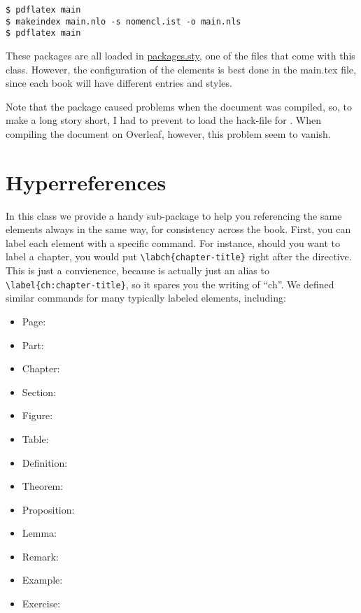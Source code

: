 \begin{lstlisting}[style=kaolstplain]
$ pdflatex main
$ makeindex main.nlo -s nomencl.ist -o main.nls
$ pdflatex main
\end{lstlisting}

These packages are all loaded in 
\href{style/packages.sty}{packages.sty}, one of the files that come with 
this class. However, the configuration of the elements is best done in 
the main.tex file, since each book will have different entries and 
styles.

Note that the  package caused problems when the 
document was compiled, so, to make a long story short, I had to prevent 
 to load the hack-file for . When 
compiling the document on Overleaf, however, this problem seem to 
vanish.


\section{Hyperreferences}

In this class we provide a handy sub-package to help you referencing the 
same elements always in the same way, for consistency across the book. 
First, you can label each element with a specific command. For instance, 
should you want to label a chapter, you would put 
\lstinline|\labch{chapter-title}| right after the  
directive. This is just a convienence, because  is 
actually just an alias to \lstinline|\label{ch:chapter-title}|, so it 
spares you the writing of \enquote{ch}. We defined similar commands for 
many typically labeled elements, including:

\begin{multicols}{2}
\setlength{\columnseprule}{0pt}
\begin{itemize}
	\item Page: 
	\item Part: 
	\item Chapter: 
	\item Section: 
	\item Figure: 
	\item Table: 
	\item Definition: 
	\item Theorem: 
	\item Proposition: 
	\item Lemma: 
	\item Remark: 
	\item Example: 
	\item Exercise: 
\end{itemize}
\end{multicols}

